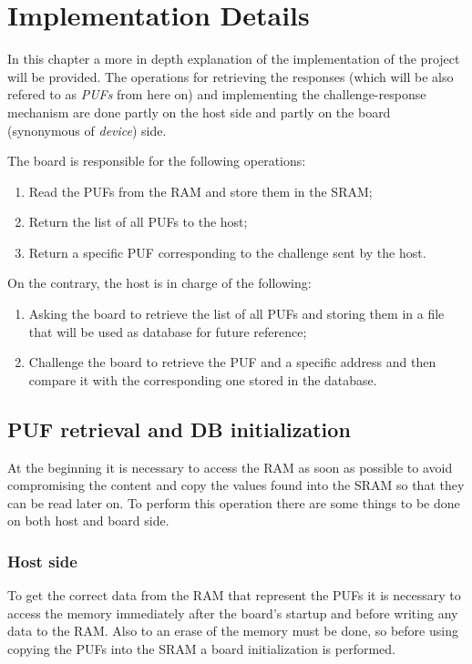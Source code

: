 \chapter{Implementation Details}
In this chapter a more in depth explanation of the implementation of the project will be provided. The operations for retrieving the responses (which will be also refered to as \emph{PUFs} from here on) and implementing the challenge-response mechanism are done partly on the host side and partly on the board (synonymous of \emph{device}) side.

The board is responsible for the following operations:
\begin{enumerate}
	\item Read the PUFs from the RAM and store them in the SRAM;
	\item Return the list of all PUFs to the host;
	\item Return a specific PUF corresponding to the challenge sent by the host.
\end{enumerate}

On the contrary, the host is in charge of the following:
\begin{enumerate}
	\item Asking the board to retrieve the list of all PUFs and storing them in a file that will be used as database for future reference;
	\item Challenge the board to retrieve the PUF and a specific address and then compare it with the corresponding one stored in the database.
\end{enumerate}


\section {PUF retrieval and DB initialization}
At the beginning it is necessary to access the RAM as soon as possible to avoid compromising the content and copy the values found into the SRAM so that they can be read later on. To perform this operation there are some things to be done on both host and board side.

\subsection{Host side}

To get the correct data from the RAM that represent the PUFs it is necessary to access the memory immediately after the board's startup and before writing any data to the RAM. Also to an erase of the memory must be done, so before using copying the PUFs into the SRAM a board initialization is performed.

